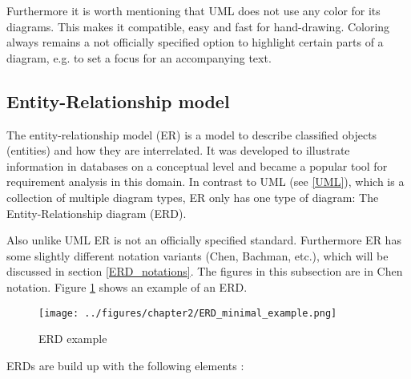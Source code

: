 \documentclass[twoside, openright, 12pt]{book}
\begin{document}
Furthermore it is worth mentioning that UML does not use any color for its diagrams.
This makes it compatible, easy and fast for hand-drawing.
Coloring always remains a not officially specified option to highlight certain parts of a diagram, e.g. to set a focus for an accompanying text.


\subsection{Entity-Relationship model}
\label{ER}
The entity-relationship model (ER) is a model to describe classified objects (entities) and how they are interrelated.
It was developed to illustrate information in databases on a conceptual level and became a popular tool for requirement analysis in this domain.
In contrast to UML (see \ref{UML}), which is a collection of multiple diagram types, ER only has one type of diagram: The Entity-Relationship diagram (ERD).

Also unlike UML ER is not an officially specified standard.
Furthermore ER has some slightly different notation variants (Chen, Bachman, etc.), which will be discussed in section \ref{ERD_notations}.
The figures in this subsection are in Chen notation.
Figure \ref{fig:ERD_minimal_example} shows an example of an ERD.


\begin{figure}[htb]
	\centering
	\texttt{[image: ../figures/chapter2/ERD\_minimal\_example.png]}
	\caption{ERD example}
	\label{fig:ERD_minimal_example}
\end{figure}

\noindent
ERDs are build up with the following elements \citep{Kleuker11}:
\end{document}
